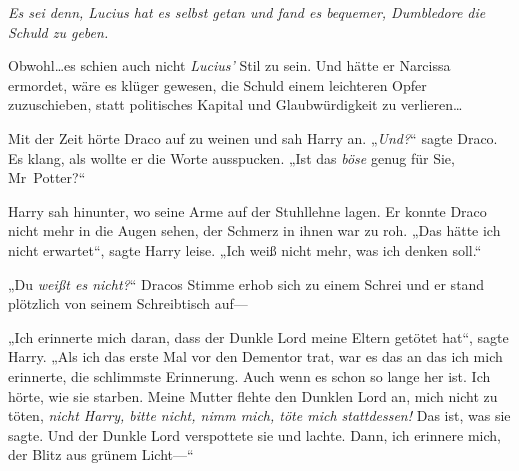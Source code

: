\emph{Es sei denn, Lucius hat es selbst getan und fand es bequemer, Dumbledore die Schuld zu geben.}

Obwohl…es schien auch nicht \emph{Lucius'} Stil zu sein. Und hätte er Narcissa ermordet, wäre es klüger gewesen, die Schuld einem leichteren Opfer zuzuschieben, statt politisches Kapital und Glaubwürdigkeit zu verlieren…

Mit der Zeit hörte Draco auf zu weinen und sah Harry an. „\emph{Und?}“ sagte Draco. Es klang, als wollte er die Worte ausspucken. „Ist das \emph{böse} genug für Sie, Mr~Potter?“

Harry sah hinunter, wo seine Arme auf der Stuhllehne lagen. Er konnte Draco nicht mehr in die Augen sehen, der Schmerz in ihnen war zu roh. „Das hätte ich nicht erwartet“, sagte Harry leise. „Ich weiß nicht mehr, was ich denken soll.“

„Du \emph{weißt es nicht?}“ Dracos Stimme erhob sich zu einem Schrei und er stand plötzlich von seinem Schreibtisch auf—

„Ich erinnerte mich daran, dass der Dunkle Lord meine Eltern getötet hat“, sagte Harry. „Als ich das erste Mal vor den Dementor trat, war es das an das ich mich erinnerte, die schlimmste Erinnerung. Auch wenn es schon so lange her ist. Ich hörte, wie sie starben. Meine Mutter flehte den Dunklen Lord an, mich nicht zu töten, \emph{nicht Harry, bitte nicht, nimm mich, töte mich stattdessen!} Das ist, was sie sagte. Und der Dunkle Lord verspottete sie und lachte. Dann, ich erinnere mich, der Blitz aus grünem Licht—“

